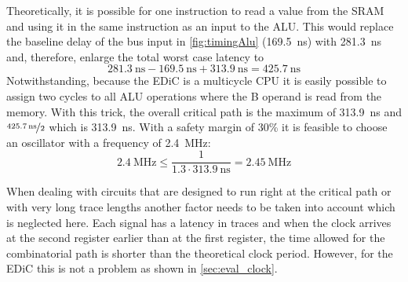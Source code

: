 Theoretically, it is possible for one instruction to read a value from the \gls{SRAM} and using it in the same instruction as an input to the \gls{ALU}.
This would replace the baseline delay of the bus input in \cref{fig:timingAlu} (\qty{169.5}{\nano\second}) with \qty{281.3}{\nano\second} and, therefore, enlarge the total worst case latency to
\begin{equation}
  \qty{281.3}{\nano\second}-\qty{169.5}{\nano\second}+\qty{313.9}{\nano\second}=\qty{425.7}{\nano\second}\label{eq:latency}
\end{equation}
Notwithstanding, because the \gls{EDiC} is a multicycle \gls{CPU} it is easily possible to assign two cycles to all \gls{ALU} operations where the B operand is read from the memory.
With this trick, the overall critical path is the maximum of \qty{313.9}{\nano\second} and $\nicefrac{\qty{425.7}{\nano\second}}{2}$ which is \qty{313.9}{\nano\second}.
With a safety margin of 30\% it is feasible to choose an oscillator with a frequency of \qty{2.4}{\mega\hertz}:
\begin{equation}
  \qty{2.4}{\mega\hertz}\leq\frac{1}{1.3\cdot\qty{313.9}{\nano\second}} =\qty{2.45}{\mega\hertz}
\end{equation}

When dealing with circuits that are designed to run right at the critical path or with very long trace lengths another factor needs to be taken into account which is neglected here.
Each signal has a latency in traces and when the clock arrives at the second register earlier than at the first register, the time allowed for the combinatorial path is shorter than the theoretical clock period.
However, for the \gls{EDiC} this is not a problem as shown in \cref{sec:eval_clock}.
